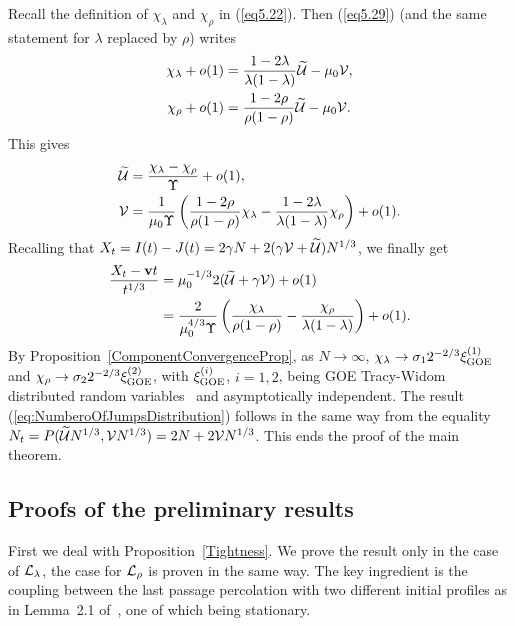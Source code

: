 \documentclass[12pt,a4paper]{article}
\numberwithin{equation}{section}
\begin{document}
Recall the definition of $\chi_\lambda$ and $\chi_\rho$ in (\ref{eq5.22}). Then (\ref{eq5.29}) (and the same statement for $\lambda$ replaced by $\rho$) writes
\begin{equation}
\begin{aligned}
\chi_\lambda+o(1)& = \frac{1-2\lambda}{\lambda(1-\lambda)}\widetilde {\cal U}-\mu_0 {\cal V},\\
\chi_\rho+o(1)& = \frac{1-2\rho}{\rho(1-\rho)}\widetilde {\cal U}-\mu_0 {\cal V}.
\end{aligned}
\end{equation}
 This gives
\begin{equation}
\begin{aligned}
\widetilde {\cal U}&=\frac{\chi_\lambda-\chi_\rho}{\Upsilon}+o(1),\\
{\cal V}&=\frac{1}{\mu_0 \Upsilon}\left(\frac{1-2\rho}{\rho(1-\rho)}\chi_\lambda-\frac{1-2\lambda}{\lambda(1-\lambda)}\chi_\rho\right)+o(1).
\end{aligned}
\end{equation}
Recalling that $X_t=I(t)-J(t)=2\gamma N + 2(\gamma {\cal V}+\widetilde {\cal U}) N^{1/3}$, we finally get
\begin{equation}
\begin{aligned}
\frac{X_t-\mathbf{v}t}{t^{1/3}} &= \mu_0^{-1/3} 2(\widetilde {\cal U}+\gamma {\cal V})+o(1)\\
&=\frac{2}{\mu_0^{4/3}\Upsilon}\left(\frac{\chi_\lambda}{\rho(1-\rho)}-\frac{\chi_\rho}{\lambda(1-\lambda)}\right)+o(1).
\end{aligned}
\end{equation}
By Proposition~\ref{ComponentConvergenceProp}, as $N\to\infty$, $\chi_\lambda \to \sigma_1 2^{-2/3}\xi_{\rm GOE}^{(1)}$ and $\chi_\rho \to \sigma_2 2^{-2/3}\xi_{\rm GOE}^{(2)}$, with $\xi_{\rm GOE}^{(i)}$, $i=1,2$, being GOE Tracy-Widom distributed random variables~\cite{TW96} and asymptotically independent. The result (\ref{eq:NumberoOfJumpsDistribution}) follows in the same way from the equality $N_t=P(\widetilde {\cal U}N^{1/3},{\cal V}N^{1/3})=2N+2{\cal V} N^{1/3}$. This ends the proof of the main theorem.


\subsection{Proofs of the preliminary results}\label{AuxilliaryResults}
First we deal with Proposition~\ref{Tightness}. We prove the result only in the case of ${\cal L}_\lambda$, the case for ${\cal L}_\rho$ is proven in the same way. The key ingredient is the coupling between the last passage percolation with two different initial profiles  as in Lemma~2.1 of~\cite{Pi17}, one of which being stationary.
\end{document}
